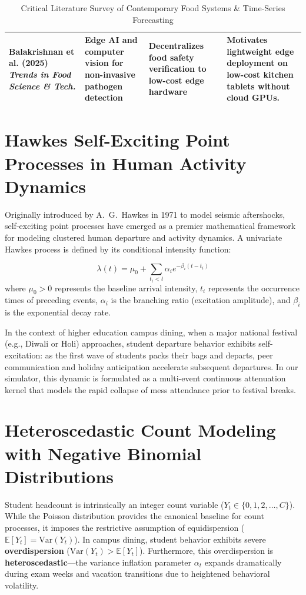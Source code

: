 \documentclass[11pt,a4paper,oneside]{report}
\begin{document}
\begin{table}[ht]
\begin{tabularx}{\textwidth}{p{3.2cm}p{3.2cm}p{4.2cm}X}
\hline
\textbf{Balakrishnan et al. (2025)} \newline \textit{Trends in Food Science \& Tech.} & Edge AI and computer vision for non-invasive pathogen detection & Decentralizes food safety verification to low-cost edge hardware & Motivates lightweight edge deployment on low-cost kitchen tablets without cloud GPUs. \\
\bottomrule
\end{tabularx}
\caption{Critical Literature Survey of Contemporary Food Systems \& Time-Series Forecasting}
\label{tab:lit_survey}
\end{table}

\section{Hawkes Self-Exciting Point Processes in Human Activity Dynamics}
Originally introduced by A.~G.~Hawkes in 1971 to model seismic aftershocks, self-exciting point processes have emerged as a premier mathematical framework for modeling clustered human departure and activity dynamics. A univariate Hawkes process is defined by its conditional intensity function:
\begin{mathformulationbox}
$$\lambda(t) = \mu_0 + \sum_{t_i < t} \alpha_i e^{-\beta_i (t - t_i)}$$
where $\mu_0 > 0$ represents the baseline arrival intensity, $t_i$ represents the occurrence times of preceding events, $\alpha_i$ is the branching ratio (excitation amplitude), and $\beta_i$ is the exponential decay rate.
\end{mathformulationbox}
In the context of higher education campus dining, when a major national festival (e.g., Diwali or Holi) approaches, student departure behavior exhibits self-excitation: as the first wave of students packs their bags and departs, peer communication and holiday anticipation accelerate subsequent departures. In our simulator, this dynamic is formulated as a multi-event continuous attenuation kernel that models the rapid collapse of mess attendance prior to festival breaks.

\section{Heteroscedastic Count Modeling with Negative Binomial Distributions}
Student headcount is intrinsically an integer count variable ($Y_t \in \{0, 1, 2, \dots, C\}$). While the Poisson distribution provides the canonical baseline for count processes, it imposes the restrictive assumption of equidispersion ($\mathbb{E}[Y_t] = \text{Var}(Y_t)$). In campus dining, student behavior exhibits severe \textbf{overdispersion} ($\text{Var}(Y_t) > \mathbb{E}[Y_t]$). Furthermore, this overdispersion is \textbf{heteroscedastic}---the variance inflation parameter $\alpha_t$ expands dramatically during exam weeks and vacation transitions due to heightened behavioral volatility.
\end{document}
